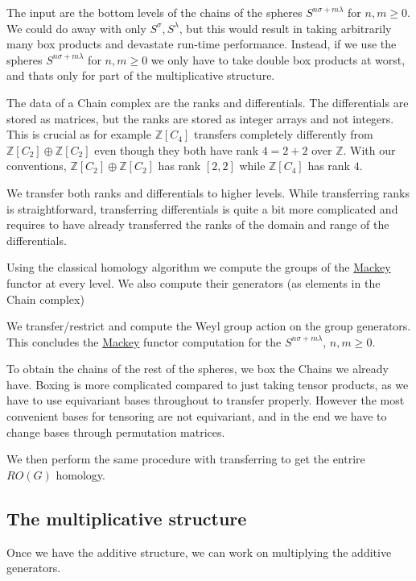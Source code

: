 \begin{DoxyItemize}
\item The input are the bottom levels of the chains of the spheres $S^{n\sigma+m\lambda}$ for $n,m\ge 0$. We could do away with only $S^{\sigma},S^{\lambda}$, but this would result in taking arbitrarily many box products and devastate run-\/time performance. Instead, if we use the spheres $S^{n\sigma+m\lambda}$ for $n,m\ge 0$ we only have to take double box products at worst, and that\textquotesingle{}s only for part of the multiplicative structure.
\item The data of a Chain complex are the ranks and differentials. The differentials are stored as matrices, but the ranks are stored as integer arrays and not integers. This is crucial as for example $\mathbb Z[C_4]$ transfers completely differently from $\mathbb Z[C_2]\oplus \mathbb Z[C_2]$ even though they both have rank $4=2+2$ over $\mathbb Z$. With our conventions, $\mathbb Z[C_2]\oplus \mathbb Z[C_2]$ has rank $[2,2]$ while $\mathbb Z[C_4]$ has rank $4$.
\item We transfer both ranks and differentials to higher levels. While transferring ranks is straightforward, transferring differentials is quite a bit more complicated and requires to have already transferred the ranks of the domain and range of the differentials.
\item Using the classical homology algorithm we compute the groups of the \hyperlink{namespaceMackey}{Mackey} functor at every level. We also compute their generators (as elements in the Chain complex)
\item We transfer/restrict and compute the Weyl group action on the group generators. This concludes the \hyperlink{namespaceMackey}{Mackey} functor computation for the $S^{n\sigma+m\lambda}$, $n,m\ge 0$.
\item To obtain the chains of the rest of the spheres, we box the Chains we already have. Boxing is more complicated compared to just taking tensor products, as we have to use equivariant bases throughout to transfer properly. However the most convenient bases for tensoring are not equivariant, and in the end we have to change bases through permutation matrices.
\item We then perform the same procedure with transferring to get the entrire $RO(G)$ homology.
\end{DoxyItemize}\hypertarget{math_mult}{}\subsection{The multiplicative structure}\label{math_mult}
Once we have the additive structure, we can work on multiplying the additive generators.


